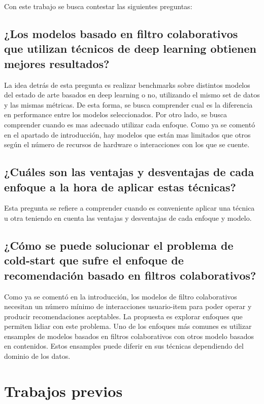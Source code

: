 \documentclass[11pt,a4paper,twoside]{thesis}
\begin{document}
Con este trabajo se busca contestar las siguientes preguntas:

\subsection{¿Los modelos basado en filtro colaborativos que utilizan técnicos de deep learning obtienen mejores resultados?}

La idea detrás de esta pregunta es realizar benchmarks sobre distintos modelos del estado de arte basados en deep learning o no, utilizando el mismo set de datos y las mismas métricas. De esta forma, se busca comprender cual es la diferencia en performance entre los modelos seleccionados. Por otro lado, se busca comprender cuando es mas adecuado utilizar cada enfoque. Como ya se comentó en el apartado de introducción, hay modelos que están mas limitados que otros según el número de recursos de hardware o interacciones con los que se cuente.

\subsection{¿Cuáles son las ventajas y desventajas de cada enfoque a la hora de aplicar estas técnicas?}

Esta pregunta se refiere a comprender cuando es conveniente aplicar una técnica u otra teniendo en cuenta las ventajas y desventajas de cada enfoque y modelo.

\subsection{¿Cómo se puede solucionar el problema de cold-start que sufre el enfoque de recomendación basado en filtros colaborativos?}

Como ya se comentó en la introducción, los modelos de filtro colaborativos necesitan un número mínimo de interacciones usuario-item para poder operar y producir recomendaciones aceptables. La propuesta es explorar enfoques que permiten lidiar con este problema. Uno de los enfoques más comunes es utilizar ensamples de modelos basados en filtros colaborativos con otros modelo basados en contenidos. Estos ensamples puede diferir en sus técnicas dependiendo del dominio de los datos.

\section{Trabajos previos}
\end{document}
